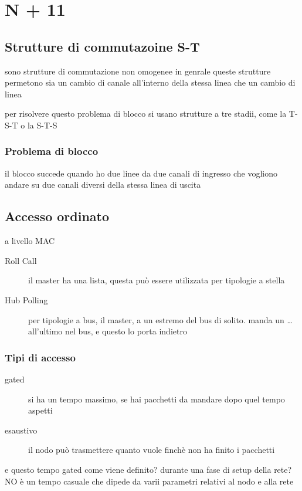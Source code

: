 \documentclass[11pt]{article}
\begin{document}
\section{N + 11}
\label{sec:org94ceecf}
\subsection{Strutture di commutazoine S-T}
\label{sec:org8300e8c}
sono strutture di commutazione non omogenee
in genrale queste strutture permetono sia un cambio di canale all'interno della stessa linea che un cambio di linea

per risolvere questo problema di blocco si usano strutture a tre stadii, come la T-S-T o la S-T-S

\subsubsection{Problema di blocco}
\label{sec:orgebac320}
il blocco succede quando ho due linee da due canali di ingresso che vogliono andare su due canali diversi della stessa linea di uscita

\subsection{Accesso ordinato}
\label{sec:orgcd90f1f}
a livello MAC
\begin{description}
\item[{Roll Call}] il master ha una lista, questa può essere utilizzata per tipologie a stella
\item[{Hub Polling}] per tipologie a bus, il master, a un estremo del bus di solito. manda un \ldots{} all'ultimo nel bus, e questo lo porta indietro
\end{description}

\subsubsection{Tipi di accesso}
\label{sec:org1d50b00}
\begin{description}
\item[{gated}] si ha un tempo massimo, se hai pacchetti da mandare dopo quel tempo aspetti
\item[{esaustivo}] il nodo può trasmettere quanto vuole finchè non ha finito i pacchetti
\end{description}

e questo tempo gated come viene definito?
durante una fase di setup della rete? NO
è un tempo casuale che dipede da varii parametri relativi al nodo e alla rete
\end{document}
